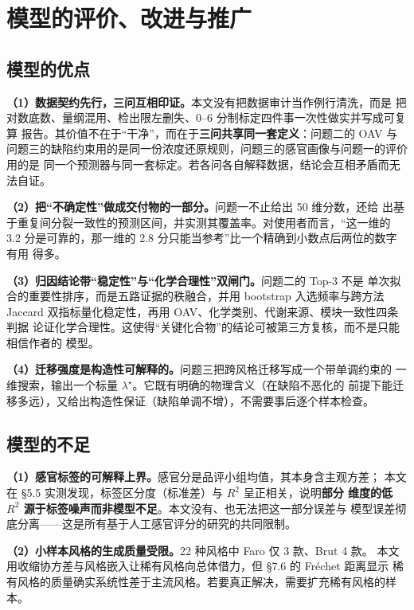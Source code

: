 \section{模型的评价、改进与推广}

\subsection{模型的优点}

\textbf{（1）数据契约先行，三问互相印证。}本文没有把数据审计当作例行清洗，而是
把对数底数、量纲混用、检出限左删失、0--6 分制标定四件事一次性做实并写成可复算
报告。其价值不在于“干净”，而在于\textbf{三问共享同一套定义}：问题二的 OAV 与
问题三的缺陷约束用的是同一份浓度还原规则，问题三的感官画像与问题一的评价用的是
同一个预测器与同一套标定。若各问各自解释数据，结论会互相矛盾而无法自证。

\textbf{（2）把“不确定性”做成交付物的一部分。}问题一不止给出 50 维分数，还给
出基于重复间分裂一致性的预测区间，并实测其覆盖率。对使用者而言，“这一维的
3.2 分是可靠的，那一维的 2.8 分只能当参考”比一个精确到小数点后两位的数字有用
得多。

\textbf{（3）归因结论带“稳定性”与“化学合理性”双闸门。}问题二的 Top-3 不是
单次拟合的重要性排序，而是五路证据的秩融合，并用 bootstrap 入选频率与跨方法
Jaccard 双指标量化稳定性，再用 OAV、化学类别、代谢来源、模块一致性四条判据
论证化学合理性。这使得“关键化合物”的结论可被第三方复核，而不是只能相信作者的
模型。

\textbf{（4）迁移强度是构造性可解释的。}问题三把跨风格迁移写成一个带单调约束的
一维搜索，输出一个标量 $\lambda^\star$。它既有明确的物理含义（在缺陷不恶化的
前提下能迁移多远），又给出构造性保证（缺陷单调不增），不需要事后逐个样本检查。

\subsection{模型的不足}

\textbf{（1）感官标签的可解释上界。}感官分是品评小组均值，其本身含主观方差；
本文在 \S5.5 实测发现，标签区分度（标准差）与 $R^2$ 呈正相关，说明\textbf{部分
维度的低 $R^2$ 源于标签噪声而非模型不足}。本文没有、也无法把这一部分误差与
模型误差彻底分离——这是所有基于人工感官评分的研究的共同限制。

\textbf{（2）小样本风格的生成质量受限。}22 种风格中 Faro 仅 3 款、Brut 4 款。
本文用收缩协方差与风格嵌入让稀有风格向总体借力，但 \S7.6 的 Fréchet 距离显示
稀有风格的质量确实系统性差于主流风格。若要真正解决，需要扩充稀有风格的样本。

